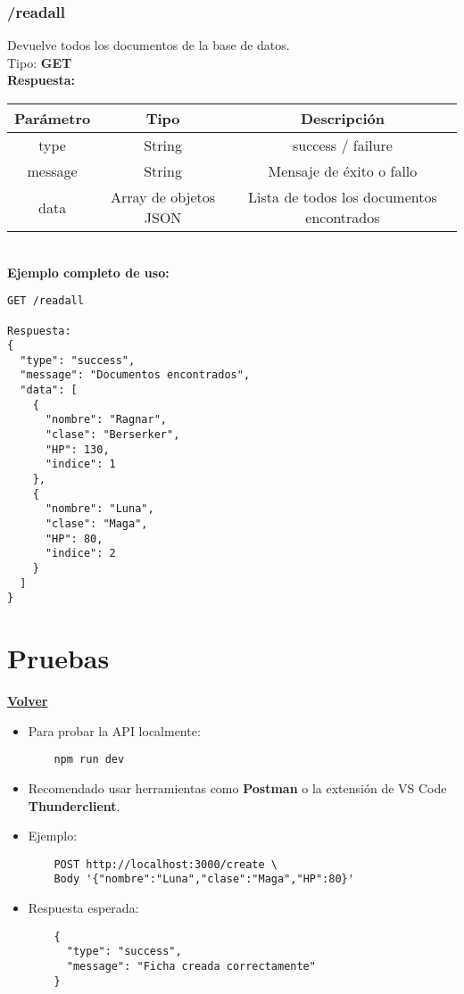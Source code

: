 \documentclass[a4paper,12pt]{article}
\begin{document}
\FloatBarrier
\subsubsection{/readall}
Devuelve todos los documentos de la base de datos.\\

Tipo: \textbf{GET}\\[0.5em]

\textbf{Respuesta:}\\

\begin{tabular}{|c|c|c|}
    \hline
    \textbf{Parámetro} & \textbf{Tipo}  & \textbf{Descripción}\\ 
    \hline
    type & String & success / failure\\ 
    \hline
    message & String & Mensaje de éxito o fallo\\ 
    \hline
    data & Array de objetos JSON & Lista de todos los documentos encontrados\\ 
    \hline
\end{tabular}\\[1em]

\textbf{Ejemplo completo de uso:}
\begin{verbatim}
GET /readall

Respuesta:
{
  "type": "success",
  "message": "Documentos encontrados",
  "data": [
    {
      "nombre": "Ragnar",
      "clase": "Berserker",
      "HP": 130,
      "indice": 1
    },
    {
      "nombre": "Luna",
      "clase": "Maga",
      "HP": 80,
      "indice": 2
    }
  ]
}
\end{verbatim}

\FloatBarrier


\clearpage

\section{Pruebas}
\hyperlink{anchor-indice}{\textbf{Volver}}\\

\begin{itemize}
    \item Para probar la API localmente:
    \begin{verbatim}
    npm run dev
    \end{verbatim}
    \item Recomendado usar herramientas como \textbf{Postman} o la extensión de VS Code \textbf{Thunderclient}.
    \item Ejemplo:
    \begin{verbatim}
    POST http://localhost:3000/create \
    Body '{"nombre":"Luna","clase":"Maga","HP":80}'
    \end{verbatim}
    \item Respuesta esperada:
    \begin{verbatim}
    {
      "type": "success",
      "message": "Ficha creada correctamente"
    }
    \end{verbatim}
\end{itemize}
\end{document}
